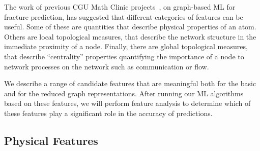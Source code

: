 The work of previous CGU Math Clinic projects~\cite{valera2018machine,schwarzer2019learning}, on graph-based ML for fracture prediction, has suggested that different categories of features can be useful. Some of these are quantities that describe physical properties of an atom.  Others are local topological measures, that describe the network structure in the immediate proximity of a node. Finally, there are global topological measures, that describe ``centrality'' properties quantifying the importance of a node to network processes on the network such as communication or flow.

We describe a range of candidate features that are meaningful both for the basic and for the reduced graph representations.
After running our ML algorithms based on these features, we will perform feature analysis to determine which of these features play a significant role in the accuracy of predictions.

\subsection{Physical Features}
\label{subsec: Physical Features}

